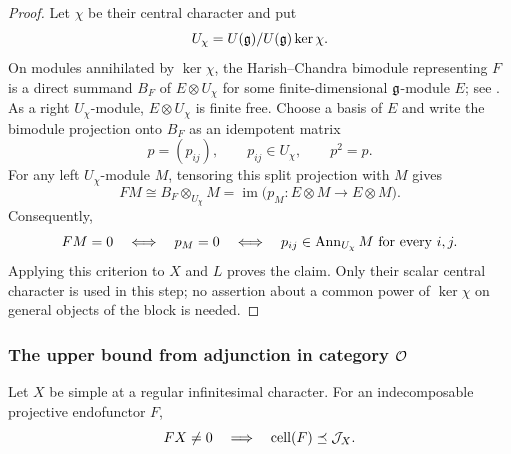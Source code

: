 \begin{proof}
Let $\chi$ be their central character and put
\[
  U_\chi=U(\mathfrak{g})/U(\mathfrak{g})\ker\chi.
\]
On modules annihilated by $\ker\chi$, the Harish--Chandra bimodule
representing $F$ is a direct summand $B_F$ of $E\otimes U_\chi$ for some
finite-dimensional $\mathfrak{g}$-module $E$; see
\cite[\S2.3]{MackaayMazorchukMiemietz2024}. As a right $U_\chi$-module,
$E\otimes U_\chi$ is finite free. Choose a basis of $E$ and write the
bimodule projection onto $B_F$ as an idempotent matrix
\[
  p=(p_{ij}),\qquad p_{ij}\in U_\chi,\qquad p^2=p.
\]
For any left $U_\chi$-module $M$, tensoring this split projection with $M$
gives
\[
  FM\cong B_F\otimes_{U_\chi}M
     =\operatorname{im}\bigl(p_M:E\otimes M\longrightarrow E\otimes M\bigr).
\]
Consequently,
\[
  FM=0\quad\Longleftrightarrow\quad p_M=0
  \quad\Longleftrightarrow\quad
  p_{ij}\in\operatorname{Ann}_{U_\chi}M\text{ for every }i,j.
\]
Applying this criterion to $X$ and $L$ proves the claim. Only their scalar
central character is used in this step; no assertion about a common power
of $\ker\chi$ on general objects of the block is needed.
\end{proof}

\subsubsection{The upper bound from adjunction in category \texorpdfstring{$\mathcal{O}$}{O}}

\begin{lem}\label{lem:strict-drop-upper-bound}
Let $X$ be simple at a regular infinitesimal character. For an
indecomposable projective endofunctor $F$,
\begin{equation}\label{eq:strict-drop-upper-bound}
  FX\neq0\quad\Longrightarrow\quad
  \operatorname{cell}(F)\preceq\mathcal{J}_X.
\end{equation}
\end{lem}

